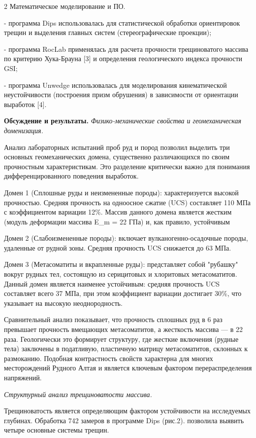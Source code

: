 \begin{multicols}{2}
Математическое моделирование и ПО.

- программа Dips использовалась для статистической обработки
ориентировок трещин и выделения главных систем (стереографические
проекции);

- программа RocLab применялась для расчета прочности трещиноватого
массива по критерию Хука-Брауна {[}3{]} и определения геологического
индекса прочности GSI;

- программа Unwedge использовалась для моделирования кинематической
неустойчивости (построения призм обрушения) в зависимости от ориентации
выработок {[}4{]}.

{\bfseries Обсуждение и результаты.} \emph{Физико-механические свойства и
геомеханическая доменизация.}

Анализ лабораторных испытаний проб руд и пород позволил выделить три
основных геомеханических домена, существенно различающихся по своим
прочностным характеристикам. Это разделение критически важно для
понимания дифференцированного поведения выработок.

Домен 1 (Сплошные руды и неизмененные породы): характеризуется высокой
прочностью. Средняя прочность на одноосное сжатие (UCS) составляет 110
МПа с коэффициентом вариации 12\%. Массив данного домена является
жестким (модуль деформации массива E\_m = 22 ГПа) и, как правило,
устойчивым

Домен 2 (Слабоизмененные породы): включает вулканогенно-осадочные
породы, удаленные от рудной зоны. Средняя прочность UCS снижается до 63
МПа.

Домен 3 (Метасоматиты и вкрапленные руды): представляет собой "рубашку"
вокруг рудных тел, состоящую из серицитовых и хлоритовых метасоматитов.
Данный домен является наименее устойчивым: средняя прочность UCS
составляет всего 37 МПа, при этом коэффициент вариации достигает 30\%,
что указывает на высокую неоднородность.

Сравнительный анализ показывает, что прочность сплошных руд в 6 раз
превышает прочность вмещающих метасоматитов, а жесткость массива --- в
22 раза. Геологически это формирует структуру, где жесткие включения
(рудные тела) заключены в податливую, пластичную матрицу метасоматитов,
склонных к размоканию. Подобная контрастность свойств характерна для
многих месторождений Рудного Алтая и является ключевым фактором
перераспределения напряжений.

\emph{Структурный анализ трещиноватости массива.}

Трещиноватость является определяющим фактором устойчивости на
исследуемых глубинах. Обработка 742 замеров в программе Dips (рис.2).
позволила выявить четыре основные системы трещин.


\end{multicols}
